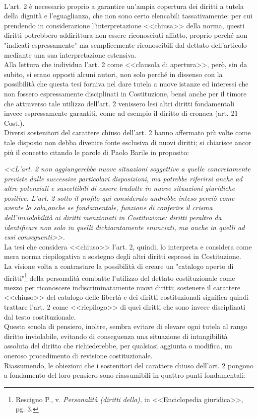 \\L'art. 2 è necessario proprio a garantire un'ampia copertura dei diritti a tutela della dignità e l'eguaglianza, che non sono certo elencabili tassativamente: per cui prendendo in considerazione l'interpretazione <<chiusa>> della norma, questi diritti potrebbero addirittura non essere riconosciuti affatto, proprio perché non "indicati espressamente" ma semplicemente riconoscibili dal dettato dell'articolo mediante una sua interpretazione estensiva. 
\\Alla lettura che individua l'art. 2 come <<clausola di apertura>>, però, sin da subito, si erano opposti alcuni autori, non solo perché in dissenso con la possibilità che questa tesi forniva nel dare tutela a nuove istanze ed interessi che non fossero espressamente disciplinati in Costituzione,  bensì anche per il timore che attraverso tale utilizzo dell’art. 2 venissero lesi altri diritti fondamentali  invece espressamente garantiti, come ad esempio il diritto di cronaca (art. 21 Cost.).
\\Diversi sostenitori del carattere chiuso dell'art. 2 hanno affermato più volte come tale disposto non debba divenire fonte esclusiva di nuovi diritti; si chiarisce ancor più il concetto citando le parole di Paolo Barile in proposito: 

\textit{<<L’art. 2 non aggiungerebbe nuove situazioni soggettive a quelle concretamente previste dalle successive particolari disposizioni, ma potrebbe riferirsi anche ad altre potenziali e suscettibili di essere tradotte in nuove situazioni giuridiche positive. L’art. 2 sotto il profilo qui considerato andrebbe inteso perciò come avente la sola,anche se fondamentale, funzione di conferire il crisma dell’inviolabilità ai diritti menzionati in Costituzione: diritti peraltro da identificare non solo in quelli dichiaratamente enunciati, ma anche in quelli ad essi conseguenti>>.} 
\\La tesi che considera <<chiuso>> l'art. 2, quindi, lo interpreta e considera come mera norma riepilogativa a sostegno degli altri diritti espressi in Costituzione. 
\\La visione volta a contrastare la possibilità di creare un "catalogo aperto di diritti"\footnote{Rescigno P., v. \textit{Personalità (diritti della)}, in <<Enciclopedia giuridica>>, pg. 3.} della personalità combatte l'utilizzo del dettato costituzionale come mezzo per riconoscere indiscriminatamente nuovi diritti; sostenere il carattere <<chiuso>> del catalogo delle  libertà e dei diritti costituzionali significa quindi trattare l'art. 2 come <<riepilogo>> di quei diritti che sono invece disciplinati dal testo costituzionale. 
\\Questa scuola di pensiero, inoltre, sembra evitare di elevare ogni tutela al rango diritto inviolabile, evitando di conseguenza una situazione di intangibilità assoluta del diritto che richiederebbe, per qualsiasi aggiunta o modifica, un oneroso procedimento di revisione costituzionale.
\\Riassumendo, le obiezioni che i sostenitori del carattere chiuso dell'art. 2 pongono a fondamento del loro pensiero sono riassumibili in quattro punti fondamentali:

